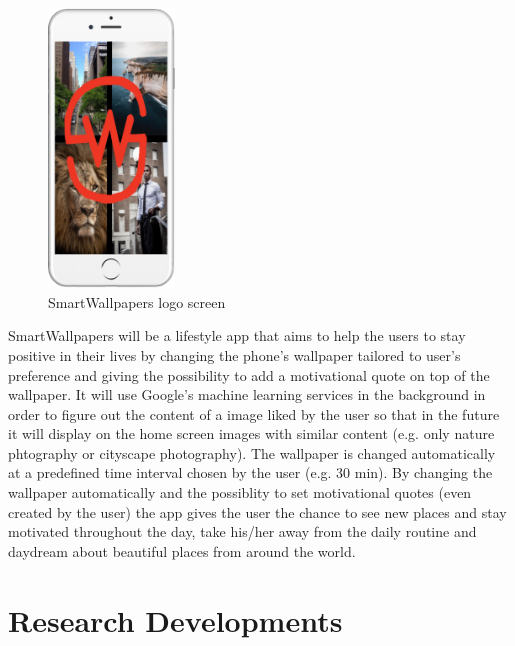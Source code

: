 \documentclass[]{article}
\begin{document}
\begin{figure}

	\centering

	\includegraphics[width = 0.3\textwidth]{imgs/sw_splash.png}

	\caption{SmartWallpapers logo screen}

\end{figure}

SmartWallpapers will be a lifestyle app that aims to help the users to stay positive in their lives by changing the phone’s wallpaper tailored to user’s preference and giving the possibility to add a motivational quote on top of the wallpaper. It will use Google’s machine learning services in the background in order to figure out the content of a image liked by the user so that in the future it will display on the home screen images with similar content (e.g. only nature phtography or cityscape photography). The wallpaper is changed automatically at a predefined time interval chosen by the user (e.g. 30 min). By changing the wallpaper automatically and the possiblity to set motivational quotes (even created by the user) the app gives the user the chance to see new places and stay motivated throughout the day, take his/her away from the daily routine and daydream about beautiful places from around the world.


\section{Research Developments }
\end{document}

